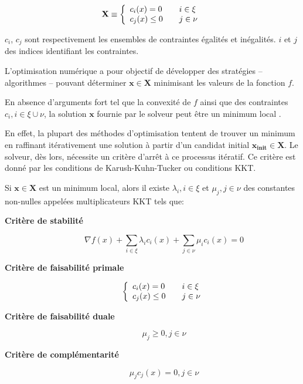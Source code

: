 \begin{equation}
  \mathbf{X} \equiv \left\{
  \begin{array}{l l}
    c_i (x) = 0    & \quad i \in \xi \\
    c_j (x) \leq 0 & \quad j \in \nu \\
  \end{array} \right.
\end{equation}

$c_i$, $c_j$ sont respectivement les ensembles de contraintes égalités
et inégalités. $i$ et $j$ des indices identifiant les contraintes.


L'optimisation numérique a pour objectif de développer des stratégies
-- algorithmes -- pouvant déterminer $\mathbf{x} \in \mathbf{X}$
minimisant les valeurs de la fonction $f$.


En absence d'arguments fort tel que la convexité de $f$ ainsi que des
contraintes $c_i, i \in \xi \cup \nu$, la solution $\mathbf{x}$
fournie par le solveur peut être un minimum local .


En effet, la plupart des méthodes d'optimisation tentent de trouver un
minimum en raffinant itérativement une solution à partir d'un candidat
initial $\mathbf{x_{\text{init}}} \in \mathbf{X}$. Le solveur, dès
lors, nécessite un critère d'arrêt à ce processus itératif. Ce critère
est donné par les conditions de Karush-Kuhn-Tucker  ou conditions KKT.

\begin{mydef}\label{def:chap1_kkt}
Si $\mathbf{x} \in \mathbf{X}$ est un minimum local, alors il existe
$\lambda_i, i \in \xi$ et $\mu_j, j \in \nu$ des constantes non-nulles
appelées multiplicateurs KKT tels que:
%
\begin{description}
\item[\textbf{Critère de stabilité}] \begin{equation}
  \nabla f(x) + \sum_{i \in \xi} \lambda_i c_i(x) + \sum_{j \in \nu} \mu_i c_i(x) = 0
\end{equation}
\item[\textbf{Critère de faisabilité primale}] \begin{equation}
\left\{
\begin{array}{l l}
  c_i (x) = 0    & \quad i \in \xi \\
  c_j (x) \leq 0 & \quad j \in \nu \\
\end{array} \right.
\end{equation}
\item[\textbf{Critère de faisabilité duale}] \begin{equation}
\mu_j \geq 0, j \in \nu
\end{equation}
\item[\textbf{Critère de complémentarité}] \begin{equation}
\mu_j c_j(x) = 0, j \in \nu
\end{equation}
\end{description}
\end{mydef}

